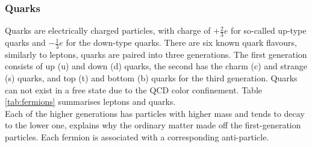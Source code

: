 \subsubsection{Quarks}
Quarks are electrically charged particles, with charge of $+\frac{2}{3}e$ for so-called up-type quarks and $-\frac{1}{3}e$ for the down-type quarks. There are six known quark flavours, similarly to leptons, quarks are paired into three generations. The first generation consists of up (u) and down (d) quarks, the second has the charm (c) and strange (s) quarks, and top (t) and bottom (b) quarks for the third generation. Quarks can not exist in a free state due to the QCD color confinement. Table \ref{tab:fermions} summarises leptons and quarks. \\
Each of the higher generations has particles with higher mass and tends to decay to the lower one, explains why the ordinary matter made off the first-generation particles. Each fermion is associated with a corresponding anti-particle.
